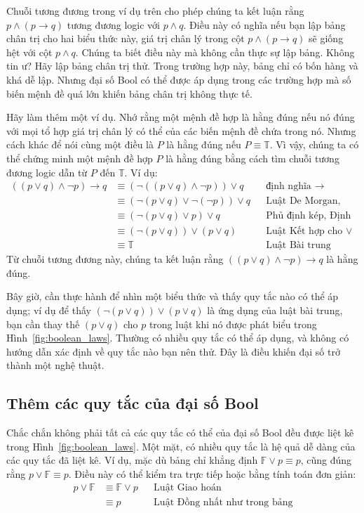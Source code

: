 Chuỗi tương đương trong ví dụ trên cho phép chúng ta kết luận rằng $p \land (p \to q)$ tương đương logic với $p \land q$. Điều này có nghĩa nếu bạn lập bảng chân trị cho hai biểu thức này, giá trị chân lý trong cột $p \land (p \to q)$ sẽ giống hệt với cột $p \land q$. Chúng ta biết điều này mà không cần thực sự lập bảng. Không tin ư? Hãy lập bảng chân trị thử. Trong trường hợp này, bảng chỉ có bốn hàng và khá dễ lập. Nhưng đại số Bool có thể được áp dụng trong các trường hợp mà số biến mệnh đề quá lớn khiến bảng chân trị không thực tế.

\begin{notebox}
Hãy làm thêm một ví dụ. Nhớ rằng một mệnh đề hợp là hằng đúng nếu nó đúng với mọi tổ hợp giá trị chân lý có thể của các biến mệnh đề chứa trong nó. Nhưng cách khác để nói cùng một điều là $P$ là hằng đúng nếu $P \equiv \mathbb{T}$. Vì vậy, chúng ta có thể chứng minh một mệnh đề hợp $P$ là hằng đúng bằng cách tìm chuỗi tương đương logic dẫn từ $P$ đến $\mathbb{T}$. Ví dụ:
\begin{align*}
((p \lor q) \land \lnot p) \to q &\equiv (\lnot((p \lor q) \land \lnot p)) \lor q && \text{định nghĩa } \to \\
&\equiv (\lnot(p \lor q) \lor \lnot(\lnot p)) \lor q && \text{Luật De Morgan, Định lý 2.2} \\
&\equiv (\lnot(p \lor q) \lor p) \lor q && \text{Phủ định kép, Định lý 2.2} \\
&\equiv (\lnot(p \lor q)) \lor (p \lor q) && \text{Luật Kết hợp cho } \lor \\
&\equiv \mathbb{T} && \text{Luật Bài trung}
\end{align*}
Từ chuỗi tương đương này, chúng ta kết luận rằng $((p \lor q) \land \lnot p) \to q$ là hằng đúng.
\end{notebox}

Bây giờ, cần thực hành để nhìn một biểu thức và thấy quy tắc nào có thể áp dụng; ví dụ để thấy $(\lnot(p \lor q)) \lor (p \lor q)$ là ứng dụng của luật bài trung, bạn cần thay thế $(p \lor q)$ cho $p$ trong luật khi nó được phát biểu trong Hình~\ref{fig:boolean_laws}. Thường có nhiều quy tắc có thể áp dụng, và không có hướng dẫn xác định về quy tắc nào bạn nên thử. Đây là điều khiến đại số trở thành một nghệ thuật.

\subsection{Thêm các quy tắc của đại số Bool}

Chắc chắn không phải tất cả các quy tắc có thể của đại số Bool đều được liệt kê trong Hình~\ref{fig:boolean_laws}. Một mặt, có nhiều quy tắc là hệ quả dễ dàng của các quy tắc đã liệt kê. Ví dụ, mặc dù bảng chỉ khẳng định $\mathbb{F} \lor p \equiv p$, cũng đúng rằng $p \lor \mathbb{F} \equiv p$. Điều này có thể kiểm tra trực tiếp hoặc bằng tính toán đơn giản:
\begin{align*}
p \lor \mathbb{F} &\equiv \mathbb{F} \lor p && \text{Luật Giao hoán} \\
&\equiv p && \text{Luật Đồng nhất như trong bảng}
\end{align*}

